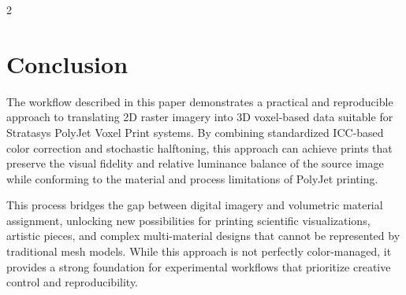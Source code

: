 \documentclass{article}
\begin{document}
\begin{multicols}{2}
\section{Conclusion}

The workflow described in this paper demonstrates a practical and reproducible approach to translating 2D raster imagery into 3D voxel-based data suitable for Stratasys PolyJet Voxel Print systems. By combining standardized ICC-based color correction and stochastic halftoning, this approach can achieve prints that preserve the visual fidelity and relative luminance balance of the source image while conforming to the material and process limitations of PolyJet printing.

This process bridges the gap between digital imagery and volumetric material assignment, unlocking new possibilities for printing scientific visualizations, artistic pieces, and complex multi-material designs that cannot be represented by traditional mesh models. While this approach is not perfectly color-managed, it provides a strong foundation for experimental workflows that prioritize creative control and reproducibility. 

\end{multicols}
\end{document}
